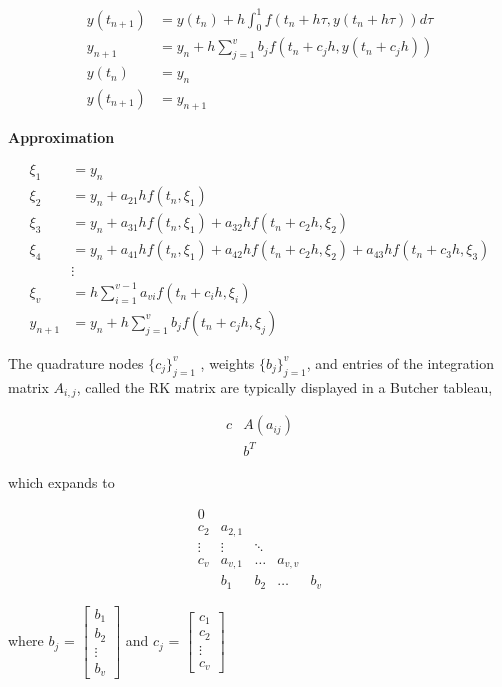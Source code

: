 \documentclass[12pt,a4paper]{article}
\begin{document}
\begin{align*}
y(t_{n+1}) &= y(t_n) + h \int_0^1 f(t_n + h\tau , y(t_n + h\tau )) d\tau \\
y_{n+1} &= y_n + h \sum_{j=1}^v b_jf(t_n + c_jh , y(t_n + c_jh ))\\
y(t_n) &= y_n \\
y(t_{n+1}) &= y_{n+1}
\end{align*}

\noindent
\textbf{Approximation}

\begin{align*}
\xi_1 &= y_n \\
\xi_2 &= y_n + a_{21}h f (t_n, \xi_1 ) \\
\xi_3 &= y_n + a_{31}h f (t_n, \xi_1 ) + a_{32}h f (t_n + c_2h, \xi_2 ) \\
\xi_4 &= y_n + a_{41}h f(t_n, \xi_1 ) + a_{42}h f (t_n + c_2h, \xi_2 ) + a_{43}h f(t_n + c_3h, \xi_3 ) \\
&\vdots \\
\xi_v &= h \sum_{i=1}^{v-1}a_{vi}f(t_n + c_ih , \xi_i ) \\
y_{n+1} &= y_n + h \sum_{j=1}^{v}b_jf(t_n + c_jh , \xi_j ) 
\end{align*}

\noindent
The quadrature nodes $\lbrace{c_j}\rbrace_{j=1}^v$ , weights $\lbrace{b_j}\rbrace_{j=1}^v$, and entries of the integration matrix $A_{i,j}$, called the RK matrix are typically displayed in a Butcher tableau,

\begin{equation*}
\begin{array}{c|c}
c  &  A(a_{ij}) \\
\hline 
\, & b^T
\end{array}
\end{equation*}

which expands to 

\begin{equation*}
  \begin{array}{c|cccc}
    0        \\
    c_2       & a_{2,1}  \\
    \vdots    & \vdots   &  \ddots  \\
    c_v       & a_{v,1}  &   \dots   & a_{v,v} \\
    \hline
    \,        & b_1      & b_2       &\dots     & b_v
  \end{array}
\end{equation*}


where $b_j$ = 
$
\begin{bmatrix}
b_1 \\
b_2 \\
\vdots \\
b_v
\end{bmatrix}
$
\qquad and  \qquad $c_j$ =
$
\begin{bmatrix}
c_1 \\
c_2 \\
\vdots \\
c_v
\end{bmatrix}
$
\end{document}
